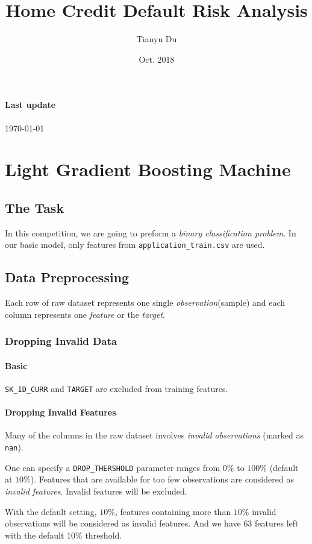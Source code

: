 \documentclass{article}
\title{Home Credit Default Risk Analysis}
\date{Oct. 2018}
\author{Tianyu Du}
\begin{document}
	\maketitle
	\paragraph{Last update} {\today}
	\tableofcontents
	\newpage
	\section{Light Gradient Boosting Machine}
		\subsection*{The Task}
			\par In this competition, we are going to preform a \emph{binary classification problem}. In our basic model, only features from \texttt{application\_train.csv} are used.
		\subsection{Data Preprocessing}
			\begin{notation}
				Each row of raw dataset represents one single \emph{observation}(sample) and each column represents one \emph{feature} or the \emph{target}.
			\end{notation}
			\subsubsection{Dropping Invalid Data}
				\paragraph{Basic} \texttt{SK\_ID\_CURR} and \texttt{TARGET} are excluded from training features.
				\paragraph{Dropping Invalid Features}
				Many of the columns in the raw dataset involves \emph{invalid observations} (marked as \texttt{nan}). 
				
				One can specify a \texttt{DROP\_THERSHOLD} parameter ranges from $0\%$ to $100\%$ (default at $10\%$). Features that are available for too few observations are considered as \emph{invalid features}. Invalid features will be excluded.
				
				With the default setting, $10\%$, features containing more than $10\%$ invalid observations will be considered as invalid features. And we have $63$ features left with the default $10\%$ threshold.
				
\end{document}
